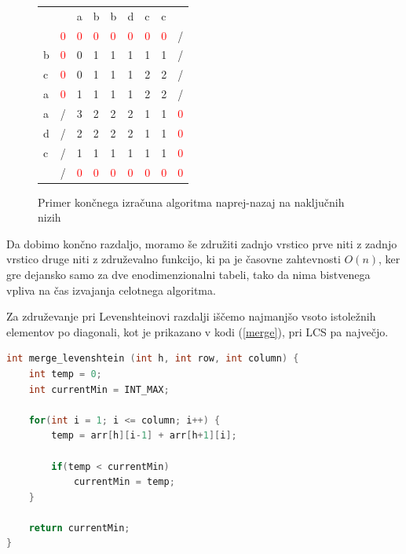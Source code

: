 \documentclass[a4paper,12pt,openright]{book}
\begin{document}
\begin{figure}[htb]
\begin{center}
\begin{tabular}{|l|l|l|l|l|l|l|l|l|}
\cline{3-8}
  \multicolumn{2}{c|}{}  & a & b & b & d & c & c & \multicolumn{1}{|c}{} \\ \cline{2-9}
 \multicolumn{1}{c|}{} & \textcolor{red}{0} & \textcolor{red}{0} & \textcolor{red}{0} & \textcolor{red}{0} & \textcolor{red}{0} & \textcolor{red}{0} & \textcolor{red}{0} & / \\ \hline
b  & \textcolor{red}{0}  & 0 & 1 & 1 & 1 & 1 & 1 & / \\ \hline
c  & \textcolor{red}{0} & 0 & 1 & 1 & 1 & 2 & 2 & / \\ \hline
a  & \textcolor{red}{0} & \cellcolor{blue!15}1 & \cellcolor{blue!15}1 & \cellcolor{blue!15}1 & \cellcolor{blue!15}1 & \cellcolor{blue!15}2 & \cellcolor{blue!15}2 & / \\ \hline
a  & / & \cellcolor{blue!15}3  & \cellcolor{blue!15}2 &  \cellcolor{blue!15}2 & \cellcolor{blue!15}2 & \cellcolor{blue!15}1 & \cellcolor{blue!15}1 & \textcolor{red}{0} \\ \hline
d  & / & 2 & 2 & 2 & 2 & 1 & 1 & \textcolor{red}{0} \\ \hline
c  & / & 1 & 1 & 1 & 1 & 1 & 1 & \textcolor{red}{0} \\ \hline
\multicolumn{1}{c|}{}  & / & \textcolor{red}{0} & \textcolor{red}{0} & \textcolor{red}{0} & \textcolor{red}{0} & \textcolor{red}{0} & \textcolor{red}{0} & \textcolor{red}{0} \\ \cline{2-9}
\end{tabular}

\end{center}
\caption{Primer končnega izračuna algoritma naprej-nazaj na naključnih nizih}
\label{fbLCSresult}
\end{figure}

Da dobimo končno razdaljo, moramo še združiti zadnjo vrstico prve niti z zadnjo vrstico druge niti z združevalno funkcijo, ki pa je časovne zahtevnosti $O(n)$, ker gre dejansko samo za dve enodimenzionalni tabeli, tako da nima bistvenega vpliva na čas izvajanja celotnega algoritma. 

Za združevanje pri Levenshteinovi razdalji iščemo najmanjšo vsoto istoležnih elementov po diagonali, kot je prikazano v kodi (\ref{merge}), pri LCS pa največjo. 

\bigskip
\begin{lstlisting}[language=C++, caption={Združevalna funkcija za Levenshteinovo razdaljo}, captionpos=b, label=merge]
int merge_levenshtein (int h, int row, int column) {
    int temp = 0;
    int currentMin = INT_MAX;

    for(int i = 1; i <= column; i++) {
        temp = arr[h][i-1] + arr[h+1][i];

        if(temp < currentMin)
            currentMin = temp;
    }

    return currentMin;
}
\end{lstlisting}
\end{document}
